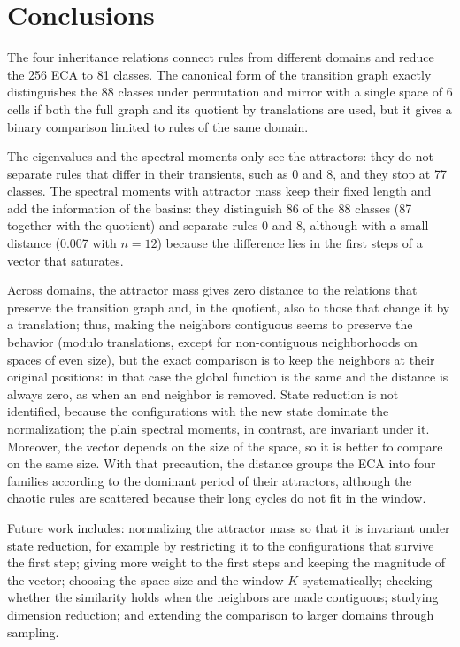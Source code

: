 \section{Conclusions}
\label{sec:conclusions}

The four inheritance relations connect rules from different domains and reduce the 256 ECA to 81 classes. The canonical form of the transition graph exactly distinguishes the 88 classes under permutation and mirror with a single space of 6 cells if both the full graph and its quotient by translations are used, but it gives a binary comparison limited to rules of the same domain.

The eigenvalues and the spectral moments only see the attractors: they do not separate rules that differ in their transients, such as 0 and 8, and they stop at 77 classes. The spectral moments with attractor mass keep their fixed length and add the information of the basins: they distinguish 86 of the 88 classes (87 together with the quotient) and separate rules 0 and 8, although with a small distance (0.007 with $n = 12$) because the difference lies in the first steps of a vector that saturates.

Across domains, the attractor mass gives zero distance to the relations that preserve the transition graph and, in the quotient, also to those that change it by a translation; thus, making the neighbors contiguous seems to preserve the behavior (modulo translations, except for non-contiguous neighborhoods on spaces of even size), but the exact comparison is to keep the neighbors at their original positions: in that case the global function is the same and the distance is always zero, as when an end neighbor is removed. State reduction is not identified, because the configurations with the new state dominate the normalization; the plain spectral moments, in contrast, are invariant under it. Moreover, the vector depends on the size of the space, so it is better to compare on the same size. With that precaution, the distance groups the ECA into four families according to the dominant period of their attractors, although the chaotic rules are scattered because their long cycles do not fit in the window.

Future work includes: normalizing the attractor mass so that it is invariant under state reduction, for example by restricting it to the configurations that survive the first step; giving more weight to the first steps and keeping the magnitude of the vector; choosing the space size and the window $K$ systematically; checking whether the similarity holds when the neighbors are made contiguous; studying dimension reduction; and extending the comparison to larger domains through sampling.
